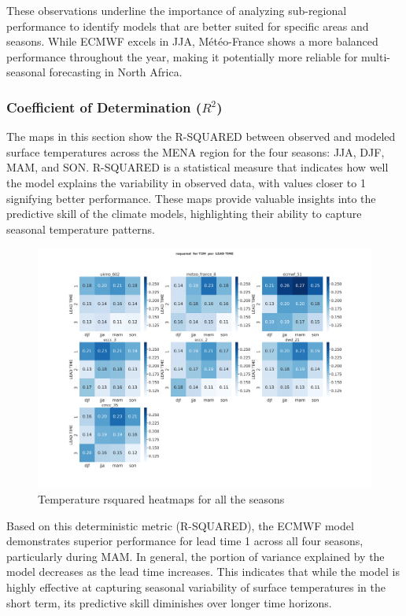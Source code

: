 These observations underline the importance of analyzing sub-regional performance to identify models that are better suited for specific areas and seasons. While ECMWF excels in JJA, Météo-France shows a more balanced performance throughout the year, making it potentially more reliable for multi-seasonal forecasting in North Africa.





\subsubsection{Coefficient of Determination (\( R^2 \))}
The maps in this section show the R-SQUARED between observed and modeled surface temperatures across the MENA region for the four seasons: JJA, DJF, MAM, and SON. R-SQUARED is a statistical measure that indicates how well the model explains the variability in observed data, with values closer to 1 signifying better performance. These maps provide valuable insights into the predictive skill of the climate models, highlighting their ability to capture seasonal temperature patterns.

\begin{figure}[H]
    \centering
    \includegraphics[width=1\linewidth]{plots/det/rsquared/rsquared_T2M.png}
    \caption{Temperature rsquared heatmaps for all the seasons}
\end{figure}

Based on this deterministic metric (R-SQUARED), the ECMWF model demonstrates superior performance for lead time 1 across all four seasons, particularly during MAM. In general, the portion of variance explained by the model decreases as the lead time increases. This indicates that while the model is highly effective at capturing seasonal variability of surface temperatures in the short term, its predictive skill diminishes over longer time horizons.

